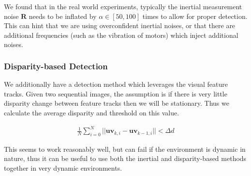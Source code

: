 We found that in the real world experiments, typically the inertial measurement noise $\mathbf{R}$ needs to be inflated by $\alpha\in[50,100]$ times to allow for proper detection. This can hint that we are using overconfident inertial noises, or that there are additional frequencies (such as the vibration of motors) which inject additional noises.\hypertarget{update-zerovelocity_update-zerovelocity-detect-disp}{}\subsubsection{Disparity-\/based Detection}\label{update-zerovelocity_update-zerovelocity-detect-disp}
We additionally have a detection method which leverages the visual feature tracks. Given two sequential images, the assumption is if there is very little disparity change between feature tracks then we will be stationary. Thus we calculate the average disparity and threshold on this value.

\begin{align*} \frac{1}{N}\sum_{i=0}^N ||\mathbf{uv}_{k,i}-\mathbf{uv}_{k-1,i}|| < \Delta d \end{align*}

This seems to work reasonably well, but can fail if the environment is dynamic in nature, thus it can be useful to use both the inertial and disparity-\/based methods together in very dynamic environments. 